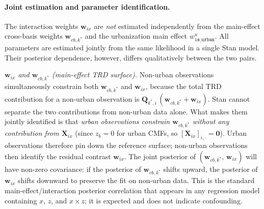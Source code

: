 \documentclass[12pt,a4paper]{article}
\begin{document}
\paragraph{Joint estimation and parameter identification.}
The interaction weights $\mathbf{w}_{ix}$ are \emph{not} estimated independently from the main-effect cross-basis weights $\mathbf{w}_{cb,k^*}$ and the urbanization main effect $w^u_{\texttt{is\_urban}}$. All parameters are estimated jointly from the same likelihood in a single Stan model. Their posterior dependence, however, differs qualitatively between the two pairs.

\smallskip\noindent\textit{$\mathbf{w}_{ix}$ and $\mathbf{w}_{cb,k^*}$ (main-effect TRD surface).}
Non-urban observations simultaneously constrain both $\mathbf{w}_{cb,k^*}$ and $\mathbf{w}_{ix}$, because the total TRD contribution for a non-urban observation is $\mathbf{Q}_{k^*,i}\,(\mathbf{w}_{cb,k^*} + \mathbf{w}_{ix})$. Stan cannot separate the two contributions from non-urban data alone. What makes them jointly identified is that \emph{urban observations constrain $\mathbf{w}_{cb,k^*}$ without any contribution from $\mathbf{X}_{ix}$} (since $z_b = 0$ for urban CMFs, so $[\mathbf{X}_{ix}]_{i,\cdot} = \mathbf{0}$). Urban observations therefore pin down the reference surface; non-urban observations then identify the residual contrast $\mathbf{w}_{ix}$. The joint posterior of $(\mathbf{w}_{cb,k^*},\, \mathbf{w}_{ix})$ will have non-zero covariance: if the posterior of $\mathbf{w}_{cb,k^*}$ shifts upward, the posterior of $\mathbf{w}_{ix}$ shifts downward to preserve the fit on non-urban data. This is the standard main-effect/interaction posterior correlation that appears in any regression model containing $x$, $z$, and $x \times z$; it is expected and does not indicate confounding.
\end{document}
